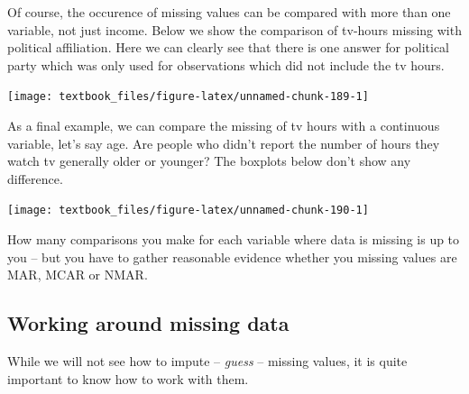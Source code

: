 \documentclass[]{tufte-book}
\newenvironment{Shaded}{}{}
\newcommand{\DataTypeTok}[1]{\textcolor[rgb]{0.56,0.13,0.00}{#1}}
\newcommand{\KeywordTok}[1]{\textcolor[rgb]{0.00,0.44,0.13}{\textbf{#1}}}
\newcommand{\NormalTok}[1]{#1}
\newcommand{\OperatorTok}[1]{\textcolor[rgb]{0.40,0.40,0.40}{#1}}
\newcommand{\StringTok}[1]{\textcolor[rgb]{0.25,0.44,0.63}{#1}}
\begin{document}
Of course, the occurence of missing values can be compared with more than one variable, not just income. Below we show the comparison of tv-hours missing with political affiliation. Here we can clearly see that there is one answer for political party which was only used for observations which did not include the tv hours.

\begin{Shaded}
\end{Shaded}

\texttt{[image: textbook\_files/figure-latex/unnamed-chunk-189-1]}

As a final example, we can compare the missing of tv hours with a continuous variable, let's say age. Are people who didn't report the number of hours they watch tv generally older or younger? The boxplots below don't show any difference.

\begin{Shaded}
\end{Shaded}

\texttt{[image: textbook\_files/figure-latex/unnamed-chunk-190-1]}

How many comparisons you make for each variable where data is missing is up to you -- but you have to gather reasonable evidence whether you missing values are MAR, MCAR or NMAR.

\hypertarget{working-around-missing-data}{%
\subsection{Working around missing data}\label{working-around-missing-data}}

While we will not see how to impute -- \emph{guess} -- missing values, it is quite important to know how to work with them.
\end{document}
